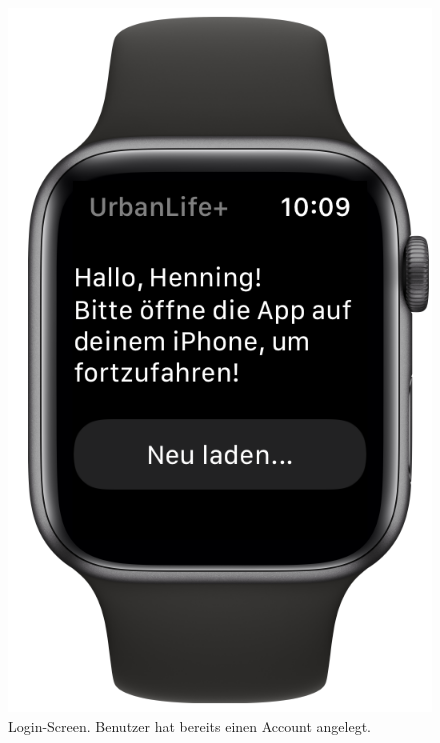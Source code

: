 \begin{minipage}{.45\textwidth}
	\begin{figure}[H]
		\centering
		\includegraphics[width=.68\textwidth]{./images/prototype/watchos/loginWithAccount.png}
		\caption{\label{fig:app:watchos:loginWithAccount}Login-Screen. Benutzer hat bereits einen Account angelegt.}
	\end{figure}
\end{minipage}

